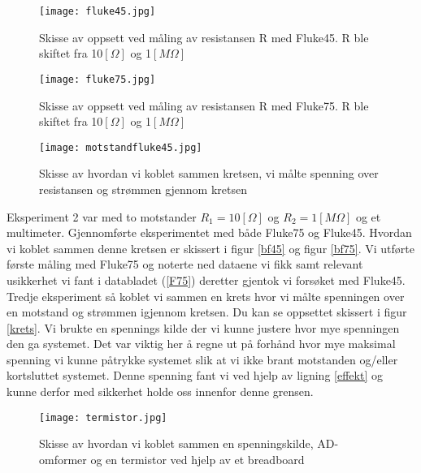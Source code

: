 \documentclass[norsk,a4paper,12pt]{article}
\begin{document}
 \begin{figure}[h!]
 	\begin{minipage}[b]{0.45\linewidth}
		\centering
  		\texttt{[image: fluke45.jpg]}
  		\caption[Breadboard og Fluke45]{Skisse av oppsett ved måling av resistansen R med Fluke45. R ble skiftet fra 10$[\Omega]$ og 1$[M\Omega]$}  	
		\label{bf45}
 	\end{minipage}
 	\hspace{0.5cm}
 	\begin{minipage}[b]{0.45\linewidth}
		\centering
  		\texttt{[image: fluke75.jpg]}
  		\caption[Breadboard og Fluke75]{Skisse av oppsett ved måling av resistansen R med Fluke75. R ble skiftet fra 10$[\Omega]$ og 1$[M\Omega]$}  	
		\label{bf75}
	\end{minipage}
\end{figure}
\begin{figure}[h!]
	\begin{center}
  	\texttt{[image: motstandfluke45.jpg]}\\
  	\caption[Skisse av krets]{Skisse av hvordan vi koblet sammen kretsen, vi målte spenning over resistansen og strømmen gjennom kretsen}
  	\label{krets}
  	\end{center}
 \end{figure}
 
Eksperiment 2 var med to motstander $R_1 = 10[\Omega]$ og $R_2 = 1[M\Omega]$ og et multimeter. Gjennomførte eksperimentet med både Fluke75 og Fluke45. Hvordan vi koblet sammen denne kretsen er skissert i figur \vref{bf45} og figur \vref{bf75}. Vi utførte første måling med Fluke75 og noterte ned dataene vi fikk samt relevant usikkerhet vi fant i databladet (\vref{F75}) deretter gjentok vi forsøket med Fluke45. \\

Tredje eksperiment så koblet vi sammen en krets hvor vi målte spenningen over en motstand og strømmen igjennom kretsen. Du kan se oppsettet skissert i figur \vref{krets}. Vi brukte en spennings kilde der vi kunne justere hvor mye spenningen den ga systemet. Det var viktig her å regne ut på forhånd hvor mye maksimal spenning vi kunne påtrykke systemet slik at vi ikke brant motstanden og/eller kortsluttet systemet. Denne spenning fant vi ved hjelp av ligning \vref{effekt} og kunne derfor med sikkerhet holde oss innenfor denne grensen. \\
\begin{figure}[h!]
	\begin{center}
  	\texttt{[image: termistor.jpg]}\\
  	\caption[Skisse av krets med termistor]{Skisse av hvordan vi koblet sammen en spenningskilde, AD-omformer og en termistor ved hjelp av et breadboard}
  	\label{termistor}
  	\end{center}
 \end{figure}
 
\end{document}
